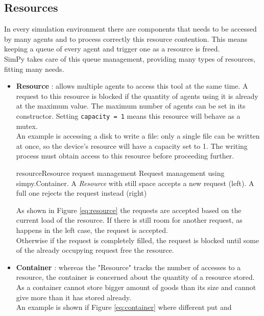 \subsection{Resources}
In every simulation environment there are components that needs to be accessed
by many agents and to process correctly this resource contention. This means
keeping a queue of every agent and trigger one as a resource is freed. \\
SimPy takes care of this queue management, providing many types of resources,
fitting many needs.
\begin{itemize}
    \item \textbf{Resource} \cite{simpy-resource}: 
        allows multiple agents to access this tool at the same time. A
        request to this resource is blocked if the quantity of agents using it
        is already at the maximum value. The maximum number of agents
        can be set in its constructor. Setting \texttt{capacity = 1} means this
        resource will behave as a mutex. \\
        An example is accessing a disk to write a file: only a single file can be
        written at once, so the device's resource will have a capacity set to 1.
        The writing process must obtain access to this resource before
        proceeding further. \\
        \begin{myimage}{resource}{Resource request management}
            Request management using simpy.Container. A \textit{Resource} with
            still space accepts a new request (left). A full one rejects the
            request instead (right)
        \end{myimage}
        As shown in Figure \ref{eq:resource} the requests are accepted based on
        the current load of the resource. If there is still room for another
        request, as happens in the left case, the request is accepted. \\
        Otherwise if the request is completely filled, the request is blocked
        until some of the already occupying request free the resource.
    \item \textbf{Container} \cite{simpy-container}: whereas the "Resource"
        tracks the number of accesses to a resource, the container is concerned
        about the quantity of a resource stored. As a container cannot store
        bigger amount of goods than its size and cannot give more than it has
        stored already.  \\
        An example is shown if Figure \ref{eq:container} where different put and

\end{itemize}
